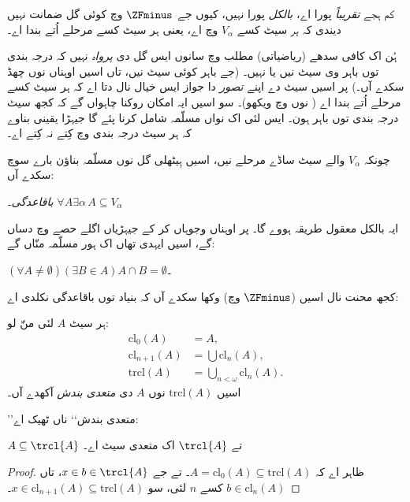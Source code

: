 \documentclass[../../../include/open-logic-section]{subfiles}
\begin{document}


کم ہجے \emph{تقریباً} پورا اے، \emph{بالکل} پورا نہیں، کیوں جے
$\ZFminus$ وچ کوئی گل ضمانت نہیں دیندی کہ \emph{ہر} سیٹ کسے $V_\alpha$
وچ اے، یعنی ہر سیٹ کسے مرحلے اُتے بندا اے۔

ہُن اک کافی سدھے (ریاضیاتی) مطلب وچ سانوں ایس گل دی \emph{پرواہ} نہیں
کہ درجہ بندی توں باہر وی سیٹ نیں یا نہیں۔ (جے باہر کوئی سیٹ نیں، تاں
اسیں اوہناں نوں چھڈ سکدے آں۔) پر اسیں سیٹ دے اپنے \emph{تصور} دا جواز
ایس خیال نال دتا اے کہ ہر سیٹ کسے مرحلے اُتے بندا اے
(\stageshier{} نوں  وچ ویکھو)۔ سو اسیں ایہ امکان
روکنا چاہواں گے کہ کجھ سیٹ درجہ بندی توں باہر ہون۔ ایس لئی اک نواں مسلّمہ
شامل کرنا پئے گا جیہڑا یقینی بناوے کہ ہر سیٹ درجہ بندی وچ کِتے نہ کِتے اے۔

چونکہ $V_\alpha$ والے سیٹ ساڈے مرحلے نیں، اسیں ہِیٹھلی گل نوں مسلّمہ
بناؤن بارے سوچ سکدے آں:

\begin{defish}
\emph{باقاعدگی۔} $\forall A \exists \alpha\, A \subseteq V_\alpha$
\end{defish}

ایہ بالکل معقول طریقہ ہووے گا۔ پر اوہناں وجوہاں کر کے جیہڑیاں اگلے حصے وچ
دساں گے، اسیں ایہدی تھاں اک ہور مسلّمہ منّاں گے:

\begin{axiom}[بنیاد]
$(\forall A \neq \emptyset)(\exists B \in A)A \cap B = \emptyset$۔
\end{axiom}

کجھ محنت نال اسیں ($\ZFminus$ وچ) وکھا سکدے آں کہ بنیاد توں باقاعدگی نکلدی اے:
\begin{defn}
ہر سیٹ $A$ لئی منّ لو:
\begin{align*}
	\text{cl}_0(A) &= A,\\
	\text{cl}_{n+1}(A) &= \bigcup \text{cl}_n(A),\\
	\text{trcl}(A) &= \bigcup_{n < \omega} \text{cl}_{n}(A).
\end{align*}
اسیں $\text{trcl}(A)$ نوں $A$ دی \emph{متعدی بندش} آکھدے آں۔
\end{defn}
\noindent
’’متعدی بندش‘‘ ناں ٹھیک اے:
\begin{prop}
$A \subseteq \trcl{A}$ تے $\trcl{A}$ اک متعدی سیٹ اے۔
\end{prop}

\begin{proof}
ظاہر اے کہ $A = \text{cl}_0(A) \subseteq \text{trcl}(A)$۔ تے جے
$x \in b \in \trcl{A}$، تاں $b \in \text{cl}_n(A)$ کسے $n$ لئی،
سو $x \in \text{cl}_{n+1}(A) \subseteq \text{trcl}(A)$۔
\end{proof}
\end{document}

